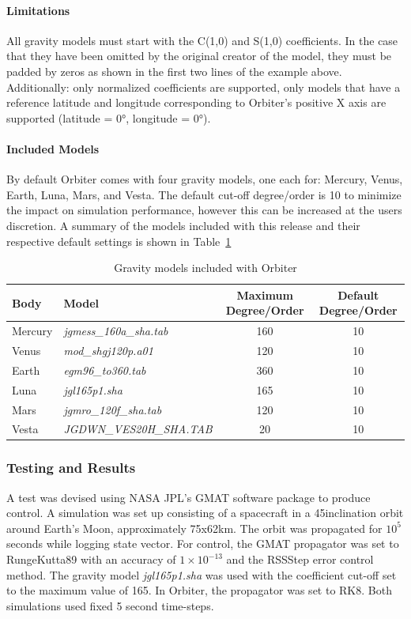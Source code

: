 \documentclass[Orbiter Technical Reference.tex]{subfiles}
\begin{document}
\paragraph{Limitations}
All gravity models must start with the C(1,0) and S(1,0) coefficients. In the case that they have been omitted by the original creator of the model, they must be padded by zeros as shown in the first two lines of the example above. Additionally: only normalized coefficients are supported, only models that have a reference latitude and longitude corresponding to Orbiter's positive X axis are supported (latitude = 0°, longitude = 0°).

\paragraph{Included Models}
By default Orbiter comes with four gravity models, one each for: Mercury, Venus, Earth, Luna, Mars, and Vesta. The default cut-off degree/order is 10 to minimize the impact on simulation performance, however this can be increased at the users discretion. A summary of the models included with this release and their respective default settings is shown in Table~\ref{tab:models}
\begin{table}[h]
\begin{tabular}{llcc}
Body    	& Model                 					& Maximum Degree/Order 		& Default Degree/Order \\\hline
Mercury 	& \emph{jgmess\_160a\_sha.tab} 		& 160                  			& 10                   \\
Venus   	& \emph{mod\_shgj120p.a01}     		& 120                  			& 10                   \\
Earth   	& \emph{egm96\_to360.tab}     			& 360                 			& 10                   \\
Luna    	&\emph{ jgl165p1.sha}				& 165                  			& 10                   \\
Mars    	&\emph{ jgmro\_120f\_sha.tab}  		& 120                  			& 10		     \\
Vesta    	&\emph{ JGDWN\_VES20H\_SHA.TAB}		& 20                  			& 10
\end{tabular}
\caption{Gravity models included with Orbiter}
\label{tab:models}
\end{table}

\subsubsection{Testing and Results}
A test was devised using NASA JPL's GMAT software package to produce control. A simulation was set up consisting of a spacecraft in a 45\textdegree inclination orbit around Earth's Moon, approximately 75x62km. The orbit was propagated for $10^5$ seconds while logging state vector. For control, the GMAT propagator was set to RungeKutta89 with an accuracy of $1\times10^{-13}$ and the RSSStep error control method. The gravity model \emph{jgl165p1.sha} was used with the coefficient cut-off set to the maximum value of 165. In Orbiter, the propagator was set to RK8. Both simulations used fixed 5 second time-steps. 
\end{document}
